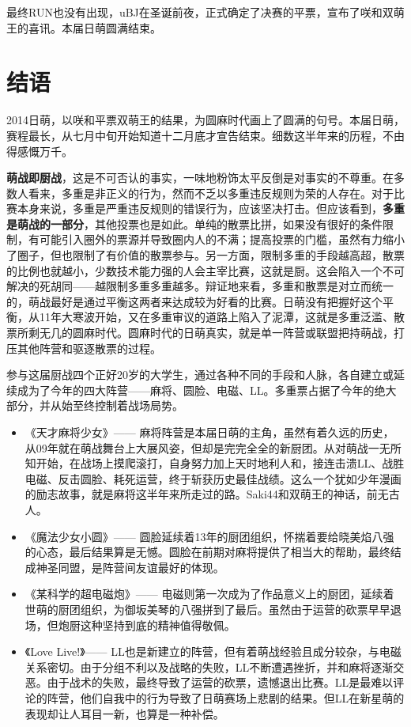 最终RUN也没有出现，uBJ在圣诞前夜，正式确定了决赛的平票，宣布了咲和双萌王的喜讯。本届日萌圆满结束。

\chapter{结语}

2014日萌，以咲和平票双萌王的结果，为圆麻时代画上了圆满的句号。本届日萌，赛程最长，从七月中旬开始知道十二月底才宣告结束。细数这半年来的历程，不由得感慨万千。

\textbf{萌战即厨战}，这是不可否认的事实，一味地粉饰太平反倒是对事实的不尊重。在多数人看来，多重是非正义的行为，然而不乏以多重违反规则为荣的人存在。对于比赛本身来说，多重是严重违反规则的错误行为，应该坚决打击。但应该看到，\textbf{多重是萌战的一部分}，其他投票也是如此。单纯的散票比拼，如果没有很好的条件限制，有可能引入圈外的票源并导致圈内人的不满；提高投票的门槛，虽然有力缩小了圈子，但也限制了有价值的散票参与。另一方面，限制多重的手段越高超，散票的比例也就越小，少数技术能力强的人会主宰比赛，这就是厨。这会陷入一个不可解决的死胡同——越限制多重多重越多。辩证地来看，多重和散票是对立而统一的，萌战最好是通过平衡这两者来达成较为好看的比赛。日萌没有把握好这个平衡，从11年大寒波开始，又在多重审议的道路上陷入了泥潭，这就是多重泛滥、散票所剩无几的圆麻时代。圆麻时代的日萌真实，就是单一阵营或联盟把持萌战，打压其他阵营和驱逐散票的过程。

参与这届厨战四个正好20岁的大学生，通过各种不同的手段和人脉，各自建立或延续成为了今年的四大阵营——麻将、圆脸、电磁、LL。多重票占据了今年的绝大部分，并从始至终控制着战场局势。

\begin{itemize}
\item 《天才麻将少女》——
麻将阵营是本届日萌的主角，虽然有着久远的历史，从09年就在萌战舞台上大展风姿，但却是完完全全的新厨团。从对萌战一无所知开始，在战场上摸爬滚打，自身努力加上天时地利人和，接连击溃LL、战胜电磁、反击圆脸、耗死运营，终于斩获历史最佳战绩。这么一个犹如少年漫画的励志故事，就是麻将这半年来所走过的路。Saki44和双萌王的神话，前无古人。
\item 《魔法少女小圆》——
圆脸延续着13年的厨团组织，怀揣着要给晓美焰八强的心态，最后结果算是无憾。圆脸在前期对麻将提供了相当大的帮助，最终结成神圣同盟，是阵营间友谊最好的体现。
\item 《某科学的超电磁炮》——
电磁则第一次成为了作品意义上的厨团，延续着世萌的厨团组织，为御坂美琴的八强拼到了最后。虽然由于运营的砍票早早退场，但炮厨这种坚持到底的精神值得敬佩。
\item 《Love Live!》——
LL也是新建立的阵营，但有着萌战经验且成分较杂，与电磁关系密切。由于分组不利以及战略的失败，LL不断遭遇挫折，并和麻将逐渐交恶。由于战术的失败，最终导致了运营的砍票，遗憾退出比赛。LL是最难以评论的阵营，他们自我中的行为导致了日萌赛场上悲剧的结果。但LL在新星萌的表现却让人耳目一新，也算是一种补偿。
\end{itemize}

